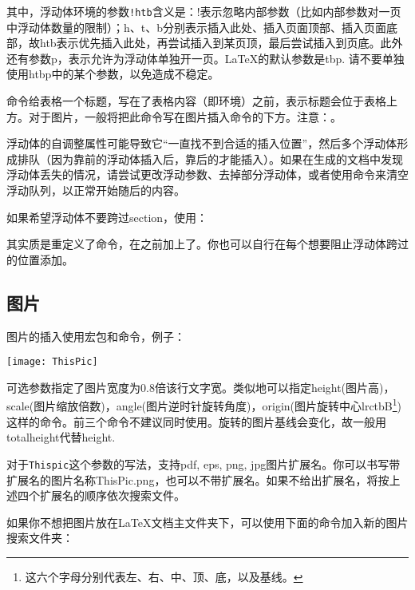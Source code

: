 其中，浮动体环境的参数\verb|!htb|含义是：!表示忽略内部参数（比如内部参数对一页中浮动体数量的限制）；h、t、b分别表示插入此处、插入页面顶部、插入页面底部，故htb表示优先插入此处，再尝试插入到某页顶，最后尝试插入到页底。此外还有参数p，表示允许为浮动体单独开一页。\LaTeX 的默认参数是tbp. 请不要单独使用htbp中的某个参数，以免造成不稳定。

命令给表格一个标题，写在了表格内容（即环境）之前，表示标题会位于表格上方。对于图片，一般将把此命令写在图片插入命令的下方。注意：。\dpar

浮动体的自调整属性可能导致它“一直找不到合适的插入位置”，然后多个浮动体形成排队（因为靠前的浮动体插入后，靠后的才能插入）。如果在生成的文档中发现浮动体丢失的情况，请尝试更改浮动参数、去掉部分浮动体，或者使用命令来清空浮动队列，以正常开始随后的内容。

如果希望浮动体不要跨过section，使用：
\begin{latex}
\usepackage[section]{placeins}
\end{latex}

其实质是重定义了命令，在之前加上了。你也可以自行在每个想要阻止浮动体跨过的位置添加。

\subsection{图片}
图片的插入使用宏包和命令，例子：
\begin{latex}
\begin{center}
    \texttt{[image: ThisPic]}
\end{center}
\end{latex}

可选参数指定了图片宽度为0.8倍该行文字宽。类似地可以指定height(图片高)，scale(图片缩放倍数)，angle(图片逆时针旋转角度)，origin(图片旋转中心lrctbB\footnote{这六个字母分别代表左、右、中、顶、底，以及基线。})这样的命令。前三个命令不建议同时使用。旋转的图片基线会变化，故一般用totalheight代替height. 

对于\texttt{Thispic}这个参数的写法，\xelatex 支持pdf, eps, png, jpg图片扩展名。你可以书写带扩展名的图片名称ThisPic.png，也可以不带扩展名。如果不给出扩展名，将按上述四个扩展名的顺序依次搜索文件。\dpar

如果你不想把图片放在\LaTeX 文档主文件夹下，可以使用下面的命令加入新的图片搜索文件夹：
\begin{latex}
\graphicspath{{c:/pics/}{./pic/}}
\end{latex}

